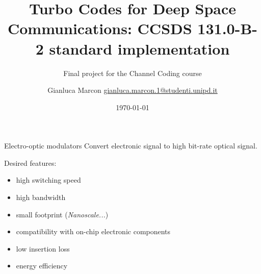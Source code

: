\documentclass[handout,xcolor={usenames,dvipsnames},11pt]{beamer}
\title{ \LARGE Turbo Codes for Deep Space Communications: CCSDS 131.0-B-2 standard implementation}
\subtitle{Final project for the Channel Coding course}
\author[G. Marcon]{Gianluca Marcon \hfill \href{mailto:gianluca.marcon.1@studenti.unipd.it}{gianluca.marcon.1@studenti.unipd.it}}
\date{\today}
\begin{document}
\maketitle

\begin{frame}{Electro-optic modulators}
    Convert electronic signal to high bit-rate optical signal.\pause

    Desired features:\pause
    \begin{itemize}
        \item high switching speed\pause
        \item high bandwidth\pause
        \item small footprint (\emph{Nanoscale...})\pause
        \item compatibility with on-chip electronic components\pause
        \item low insertion loss\pause
        \item energy efficiency
    \end{itemize}    
\end{frame}
\end{document}
